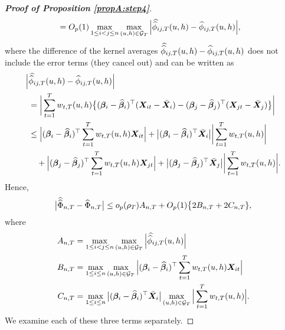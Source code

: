 \begin{proof}[\textnormal{\textbf{Proof of Proposition \ref{propA:step4}}}]
\begin{align*}
 & = O_p(1) \max_{1 \le i < j \le n} \max_{(u,h) \in \mathcal{G}_T} \Big| \doublehat{\phi}_{ij, T}(u,h) - \widehat{\phi}_{ij, T}(u,h) \Big|,
\end{align*}
where the difference of the kernel averages $\doublehat{\phi}_{ij, T}(u,h) - \widehat{\phi}_{ij, T}(u,h) $ does not include the error terms (they cancel out) and can be written as
\begin{align*}
\Big| & \doublehat{\phi}_{ij, T}(u,h) - \widehat{\phi}_{ij, T}(u,h) \Big| \\
 & = \bigg| \sum_{t=1}^T w_{t,T}(u,h) \big\{ (\bfbeta_i - \widehat{\bfbeta}_i)^\top (\X_{it} - \bar{\X}_{i}) - (\bfbeta_j - \widehat{\bfbeta}_j)^\top (\X_{jt} - \bar{\X}_{j}) \big\} \bigg| \\
 & \le \Big|(\bfbeta_i - \widehat{\bfbeta}_i)^\top \sum_{t=1}^T w_{t,T}(u,h) \X_{it} \Big| +  \big|(\bfbeta_i - \widehat{\bfbeta}_i)^\top\bar{\X}_{i}\big| \bigg| \sum_{t=1}^T w_{t,T}(u,h)  \bigg| \\
 & \quad +\Big|(\bfbeta_j - \widehat{\bfbeta}_j)^\top \sum_{t=1}^T w_{t,T}(u,h) \X_{jt}  \Big| + \big|(\bfbeta_j - \widehat{\bfbeta}_j)^\top\bar{\X}_{j}\big| \bigg| \sum_{t=1}^T w_{t,T}(u,h)  \bigg|. 
\end{align*}
Hence,
\begin{equation}\label{ineq-diff-1}
\big| \widehat{\widehat{\Phi}}_{n, T} - \widehat{\Phi}_{n, T} \big| \le o_p( \rho_T) A_{n,T} + O_p(1) \big\{ 2B_{n,T} + 2C_{n,T} \}, 
\end{equation}
where 
\begin{align*}
A_{n,T} & = \max_{1 \le i< j \le n} \max_{(u,h) \in \mathcal{G}_T} \Big|\doublehat{\phi}_{ij,T}(u,h)\Big| \\
B_{n,T} & = \max_{1 \le i \le n} \max_{(u,h) \in \mathcal{G}_T} \Big| (\bfbeta_i - \widehat{\bfbeta}_i)^\top\sum_{t=1}^T w_{t,T}(u,h) \X_{it} \Big| \\
C_{n,T} & = \max_{1 \le i \le n}\big|(\bfbeta_i - \widehat{\bfbeta}_i)^\top\bar{\X}_{i}\big| \max_{(u,h) \in \mathcal{G}_T}  \Big| \sum_{t=1}^T w_{t,T}(u,h)  \Big|. 
\end{align*}
We examine each of these three terms separately. 



\end{proof}

